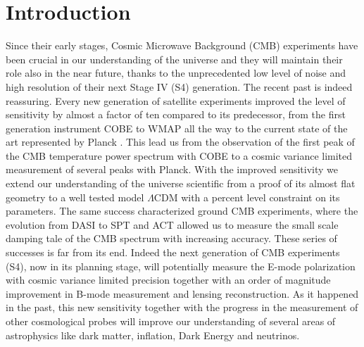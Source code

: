\documentclass[aps,prd,reprint,superscriptaddress]{revtex4-1}
\begin{document}
\section{Introduction}\label{sec:intro}
Since their early stages, Cosmic Microwave Background (CMB) experiments have been crucial in our understanding of the universe and they will maintain their role also in the near future, thanks to the unprecedented low level of noise and high resolution of their next Stage IV (S4) generation. 
The recent past is indeed reassuring. 
Every new generation of satellite experiments improved the level of sensitivity by almost a factor of ten compared to its predecessor, from the first generation instrument COBE to WMAP all the way to the current state of the art represented by Planck \cite{2015arXiv150201589P,2014A&A...571A..16P,2003ApJS..148..175S,2000ApJ...545L...5H,2000Natur.404..955D}.
This lead us from the observation of the first peak of the CMB temperature power spectrum with COBE to a cosmic variance limited measurement of several peaks with Planck. With the improved sensitivity we extend our understanding of the universe scientific from a proof of its almost flat geometry to a well tested model $\Lambda$CDM with a percent level constraint on its parameters.
The same success characterized ground CMB experiments, where the evolution from DASI \cite{2002ApJ...568...38H} to SPT and ACT \cite{2011ApJ...739...52D} \cite{2011ApJ...743...28K} allowed us to measure the small scale damping tale of the CMB spectrum with increasing accuracy.
These series of successes is far from its end. Indeed the next generation of CMB experiments (S4), now in its planning stage, will potentially measure the E-mode polarization with cosmic variance limited precision together with an order of magnitude improvement in B-mode measurement and lensing reconstruction.
As it happened in the past, this new sensitivity together with the progress in the measurement of other cosmological probes will improve our understanding of several areas of astrophysics like dark matter, inflation, Dark Energy and neutrinos. 
\end{document}
